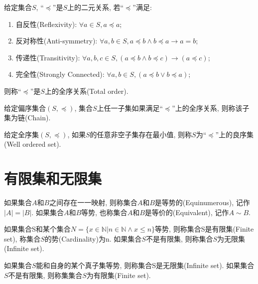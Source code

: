 \begin{definition}[全序关系]
	给定集合$S$, ``$\preccurlyeq$''是$S$上的二元关系, 若``$\preccurlyeq$''满足:
	\begin{enumerate}
		\item 自反性(Reflexivity): $\forall a\in S, a\preccurlyeq a$;
		\item 反对称性(Anti-symmetry): $\forall a,b\in S, a\preccurlyeq b\wedge b\preccurlyeq a\rightarrow a=b$;
		\item 传递性(Transitivity): $\forall a,b,c\in S, (a\preccurlyeq b\wedge b\preccurlyeq c)\rightarrow (a\preccurlyeq c)$;
		\item 完全性(Strongly Connected): $\forall a,b\in S, (a\preccurlyeq b\vee b\preccurlyeq a)$;
	\end{enumerate}
	则称``$\preccurlyeq$''是$S$上的全序关系(Total order).
\end{definition}

\begin{definition}[链]
	给定偏序集合$(S,\preccurlyeq)$, 集合$S$上任一子集如果满足``$\preccurlyeq$''上的全序关系, 则称该子集为链(Chain).
\end{definition}

\begin{definition}[良序集]
	给定全序集$(S,\preccurlyeq)$, 如果$S$的任意非空子集存在最小值, 则称$S$为``$\preccurlyeq$''上的良序集(Well ordered set).
\end{definition}

\section{有限集和无限集}
\begin{definition}[等势]
	如果集合$A$和$B$之间存在一一映射, 则称集合$A$和$B$是等势的(Equinumerous), 记作$|A|=|B|$. 如果集合$A$和$B$等势, 也称集合$A$和$B$是等价的(Equivalent), 记作$A\sim B$.
\end{definition}

\begin{definition}[有限集和无限集的定义1]
如果集合S和某个集合$N=\{x\in \mathbb{N}|n\in \mathbb{N}\wedge x\leqslant n\}$等势, 则称集合S是有限集(Finite set), 称集合$S$的势(Cardinality)为n. 如果集合$S$不是有限集, 则称集合$S$为无限集(Infinite set).
\end{definition}

\begin{definition}
	如果集合$S$能和自身的某个真子集等势, 则称集合S是无限集(Infinite set). 如果集合$S$不是有限集, 则称集集合$S$为有限集(Finite set).
\end{definition}

